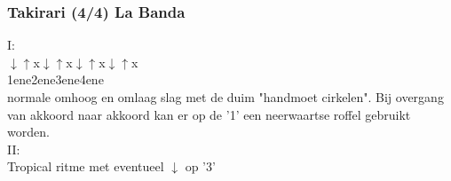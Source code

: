 \subsubsection*{Takirari (4/4) La Banda}
I:\\
$\downarrow$\hspace{2.0em}$\uparrow$\hspace{2.6em}x\hspace{2.0em}$\downarrow$\hspace{2.2em}$\uparrow$\hspace{2.6em}x\hspace{2em}$\downarrow$\hspace{2.1em}$\uparrow$\hspace{2.6em}x\hspace{2.0em}$\downarrow$\hspace{2.2em}$\uparrow$\hspace{2.5em}x\\
1\hspace{2em}en\hspace{2em}e\hspace{2em}2\hspace{2em}en\hspace{2em}e\hspace{2em}3\hspace{2em}en\hspace{2em}e\hspace{2em}4\hspace{2em}en\hspace{2em}e\\
normale omhoog en omlaag slag met de duim "handmoet cirkelen". Bij overgang van akkoord naar akkoord kan er op de '1' een neerwaartse roffel gebruikt worden.\\
II:\\
Tropical ritme met eventueel $\downarrow$ op '3'\\


